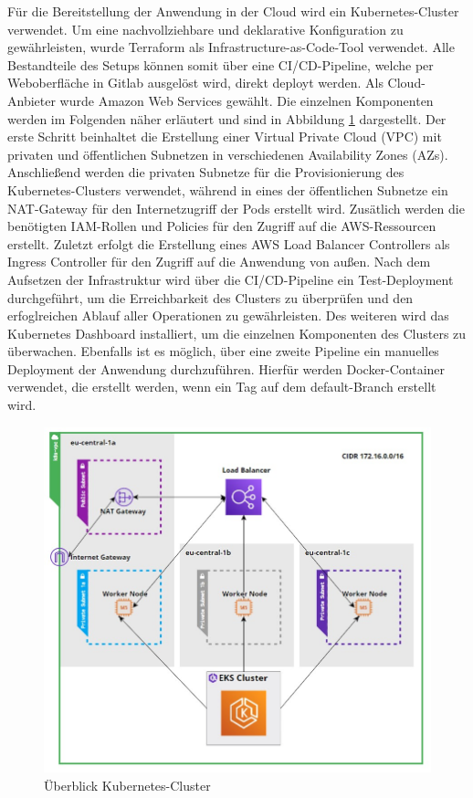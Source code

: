 \documentclass[a4paper, 10pt, conference]{IEEEtran}
\begin{document}
Für die Bereitstellung der Anwendung in der Cloud wird ein Kubernetes-Cluster \cite{k8s} verwendet. 
Um eine nachvollziehbare und deklarative Konfiguration zu gewährleisten, wurde Terraform \cite{terraform} als Infrastructure-as-Code-Tool verwendet. 
Alle Bestandteile des Setups können somit über eine CI/CD-Pipeline, welche per Weboberfläche in Gitlab ausgelöst wird, direkt deployt werden.
Als Cloud-Anbieter wurde Amazon Web Services gewählt. Die einzelnen Komponenten werden im Folgenden näher erläutert und sind in Abbildung \ref{fig:infra} dargestellt.
Der erste Schritt beinhaltet die Erstellung einer Virtual Private Cloud (VPC) mit privaten und öffentlichen Subnetzen in verschiedenen Availability Zones (AZs).
Anschließend werden die privaten Subnetze für die Provisionierung des Kubernetes-Clusters verwendet, während in eines der öffentlichen Subnetze ein NAT-Gateway für den Internetzugriff der Pods erstellt wird.
Zusätlich werden die benötigten IAM-Rollen und Policies für den Zugriff auf die AWS-Ressourcen erstellt.
Zuletzt erfolgt die Erstellung eines AWS Load Balancer Controllers als Ingress Controller für den Zugriff auf die Anwendung von außen.
Nach dem Aufsetzen der Infrastruktur wird über die CI/CD-Pipeline ein Test-Deployment durchgeführt, um die Erreichbarkeit des Clusters zu überprüfen und den erfoglreichen Ablauf aller Operationen zu gewährleisten.
Des weiteren wird das Kubernetes Dashboard installiert, um die einzelnen Komponenten des Clusters zu überwachen.
Ebenfalls ist es möglich, über eine zweite Pipeline ein manuelles Deployment der Anwendung durchzuführen.
Hierfür werden Docker-Container verwendet, die erstellt werden, wenn ein Tag auf dem default-Branch erstellt wird.

\begin{figure}[thp]
    \centering
    \includegraphics[width=\linewidth]{k8s}
    \caption{Überblick Kubernetes-Cluster}
    \label{fig:infra}
\end{figure}
\end{document}
